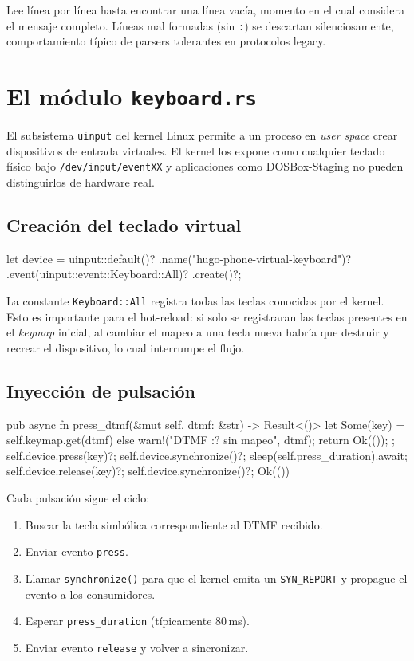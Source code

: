 Lee línea por línea hasta encontrar una línea vacía, momento en el cual considera el mensaje completo. Líneas mal formadas (sin \texttt{:}) se descartan silenciosamente, comportamiento típico de parsers tolerantes en protocolos legacy.

\section{El módulo \texttt{keyboard.rs}}

El subsistema \texttt{uinput} del kernel Linux permite a un proceso en \emph{user space} crear dispositivos de entrada virtuales. El kernel los expone como cualquier teclado físico bajo \texttt{/dev/input/eventXX} y aplicaciones como DOSBox-Staging no pueden distinguirlos de hardware real.

\subsection{Creación del teclado virtual}

\begin{rustcode}
let device = uinput::default()?
    .name("hugo-phone-virtual-keyboard")?
    .event(uinput::event::Keyboard::All)?
    .create()?;
\end{rustcode}

La constante \texttt{Keyboard::All} registra todas las teclas conocidas por el kernel. Esto es importante para el hot-reload: si solo se registraran las teclas presentes en el \emph{keymap} inicial, al cambiar el mapeo a una tecla nueva habría que destruir y recrear el dispositivo, lo cual interrumpe el flujo.

\subsection{Inyección de pulsación}

\begin{rustcode}
pub async fn press_dtmf(&mut self, dtmf: &str) -> Result<()> {
    let Some(key) = self.keymap.get(dtmf) else {
        warn!("DTMF {:?} sin mapeo", dtmf);
        return Ok(());
    };
    self.device.press(key)?;
    self.device.synchronize()?;
    sleep(self.press_duration).await;
    self.device.release(key)?;
    self.device.synchronize()?;
    Ok(())
}
\end{rustcode}

Cada pulsación sigue el ciclo:

\begin{enumerate}
  \item Buscar la tecla simbólica correspondiente al DTMF recibido.
  \item Enviar evento \texttt{press}.
  \item Llamar \texttt{synchronize()} para que el kernel emita un \texttt{SYN\_REPORT} y propague el evento a los consumidores.
  \item Esperar \texttt{press\_duration} (típicamente 80\,ms).
  \item Enviar evento \texttt{release} y volver a sincronizar.
\end{enumerate}

